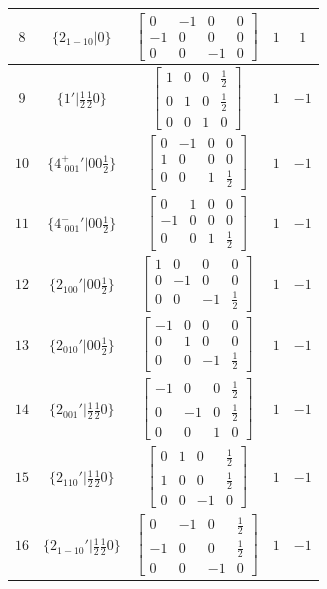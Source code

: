 \documentclass[fleqn,8pt]{jsarticle}
\begin{document}
\begin{longtable}{ccccc}
$ 8 $ & $ \{2{}_{1-10}|0\} $ & $ \begin{bmatrix} 0 & -1 & 0 & 0 \\ -1 & 0 & 0 & 0 \\ 0 & 0 & -1 & 0 \end{bmatrix} $ & $ 1 $ & $ 1 $ \\ \hline
$ 9 $ & $ \{1{}'|\frac{1}{2} \frac{1}{2} 0\} $ & $ \begin{bmatrix} 1 & 0 & 0 & \frac{1}{2} \\ 0 & 1 & 0 & \frac{1}{2} \\ 0 & 0 & 1 & 0 \end{bmatrix} $ & $ 1 $ & $ -1 $ \\ \hline
$ 10 $ & $ \{4^{+}_{\,\,001}{}'|0 0 \frac{1}{2}\} $ & $ \begin{bmatrix} 0 & -1 & 0 & 0 \\ 1 & 0 & 0 & 0 \\ 0 & 0 & 1 & \frac{1}{2} \end{bmatrix} $ & $ 1 $ & $ -1 $ \\ \hline
$ 11 $ & $ \{4^{-}_{\,\,001}{}'|0 0 \frac{1}{2}\} $ & $ \begin{bmatrix} 0 & 1 & 0 & 0 \\ -1 & 0 & 0 & 0 \\ 0 & 0 & 1 & \frac{1}{2} \end{bmatrix} $ & $ 1 $ & $ -1 $ \\ \hline
$ 12 $ & $ \{2{}_{100}{}'|0 0 \frac{1}{2}\} $ & $ \begin{bmatrix} 1 & 0 & 0 & 0 \\ 0 & -1 & 0 & 0 \\ 0 & 0 & -1 & \frac{1}{2} \end{bmatrix} $ & $ 1 $ & $ -1 $ \\ \hline
$ 13 $ & $ \{2{}_{010}{}'|0 0 \frac{1}{2}\} $ & $ \begin{bmatrix} -1 & 0 & 0 & 0 \\ 0 & 1 & 0 & 0 \\ 0 & 0 & -1 & \frac{1}{2} \end{bmatrix} $ & $ 1 $ & $ -1 $ \\ \hline
$ 14 $ & $ \{2{}_{001}{}'|\frac{1}{2} \frac{1}{2} 0\} $ & $ \begin{bmatrix} -1 & 0 & 0 & \frac{1}{2} \\ 0 & -1 & 0 & \frac{1}{2} \\ 0 & 0 & 1 & 0 \end{bmatrix} $ & $ 1 $ & $ -1 $ \\ \hline
$ 15 $ & $ \{2{}_{110}{}'|\frac{1}{2} \frac{1}{2} 0\} $ & $ \begin{bmatrix} 0 & 1 & 0 & \frac{1}{2} \\ 1 & 0 & 0 & \frac{1}{2} \\ 0 & 0 & -1 & 0 \end{bmatrix} $ & $ 1 $ & $ -1 $ \\ \hline
$ 16 $ & $ \{2{}_{1-10}{}'|\frac{1}{2} \frac{1}{2} 0\} $ & $ \begin{bmatrix} 0 & -1 & 0 & \frac{1}{2} \\ -1 & 0 & 0 & \frac{1}{2} \\ 0 & 0 & -1 & 0 \end{bmatrix} $ & $ 1 $ & $ -1 $ \\
\end{longtable}
\end{document}
